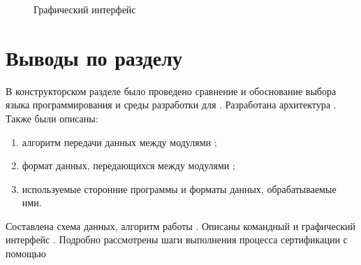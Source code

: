 %        

\begin{figure}[!htbp]
    \caption{Графический интерфейс {\ProgModule}\label{fig:apndv-gooey}}
\end{figure}

\section{Выводы по разделу}\label{sec:ch1/sec5}
В конструкторском разделе было проведено сравнение и обоснование выбора языка программирования
и среды разработки для {\ProgModule}.
Разработана архитектура {\ProgModule}.
Также были описаны:
\begin{enumerate}[label={\arabic*)}]
    \item алгоритм передачи данных между модулями {\ProgModule};
    \item формат данных, передающихся между модулями {\ProgModule};
    \item используемые сторонние программы и форматы данных, обрабатываемые ими.
\end{enumerate}
Составлена схема данных, алгоритм работы {\ProgModule}. Описаны командный и графический интерфейс {\ProgModule}.
Подробно рассмотрены шаги выполнения процесса сертификации с помощью {\ProgModule}

